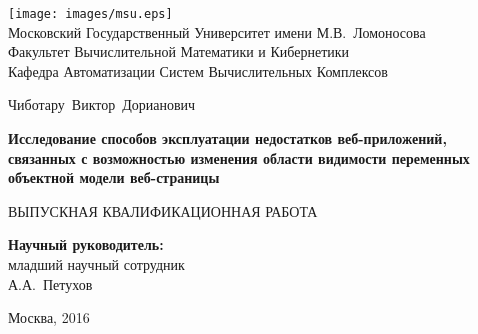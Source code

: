 \thispagestyle{empty}


\begin{center}

\texttt{[image: images/msu.eps]}\\
{Московский Государственный Университет имени М.В.~Ломоносова}\\
Факультет Вычислительной Математики и Кибернетики\\
Кафедра Автоматизации Систем Вычислительных Комплексов

\vspace{5cm}

{\Large Чиботару~Виктор~Дорианович}

\vspace{1cm}

{\Large\bfseries
Исследование способов эксплуатации недостатков веб-приложений, связанных с возможностью изменения области видимости переменных объектной модели веб-страницы\\}

\vspace{1cm}

{\large ВЫПУСКНАЯ КВАЛИФИКАЦИОННАЯ РАБОТА}
\end{center}

\vfill

\begin{flushright}
  \textbf{Научный руководитель:}\\
  младший научный сотрудник\\
  А.А.~Петухов
\end{flushright}

\vfill

\begin{center}
Москва, 2016
\end{center}

\newpage